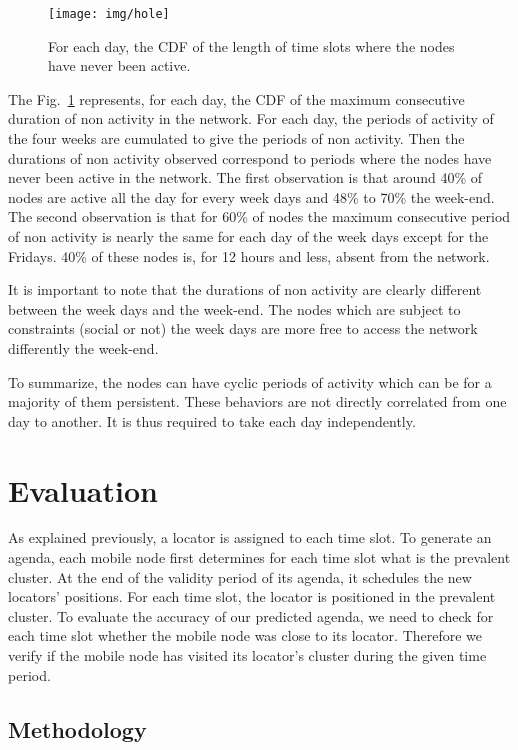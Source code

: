 \documentclass[a4paper]{sig-alternate-10pt}
\begin{document}
\begin{figure}
\texttt{[image: img/hole]}
\caption{For each day, the CDF of the length of time slots where the
nodes have never been active.} \label{fig:day_hole}
\end{figure}

The Fig.~\ref{fig:day_hole} represents, for each day, the
\textsc{CDF} of the ma\-ximum consecutive duration of non activity
in the network. For each day, the periods of activity of the four
weeks are cumulated to give the periods of non activity. Then the
durations of non activity observed correspond to periods where the
nodes have never been active in the network. The first
observation is that around 40\% of nodes are active all the
day for every week days and 48\% to 70\% the week-end. The second
observation is that for 60\% of nodes the maximum consecutive
period of non activity is nearly the same for each day of the week
days except for the Fridays. 40\% of these nodes is, for 12
hours and less, absent from the network.

It is important to note that the durations of non activity are
clearly different between the week days and the week-end. The
nodes which are subject to constraints (social or not) the
week days are more free to access the network differently the
week-end.

To summarize, the nodes can have cyclic pe\-riods of activity
which can be for a majority of them persistent. These behaviors are
not directly correlated from one day to another. It is thus required
to take each day independently.



\section{Evaluation}
\label{sec:evaluation}

As explained previously, a locator is assigned to each time slot. To
generate an agenda, each mobile node first determines for each time
slot what is the prevalent cluster. At the end of the validity period 
of its agenda, it schedules the new locators' positions. For each 
time slot, the locator is positioned in the prevalent cluster. 
To evaluate the accuracy of our predicted agenda, we need
to check for each time slot whether the mobile node was close to
its locator. Therefore we verify if the mobile node has visited its
locator's cluster during the given time period.

\subsection{Methodology}
\end{document}
